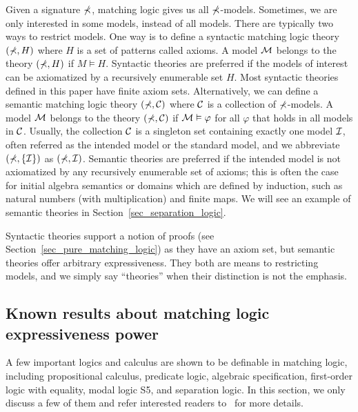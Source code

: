 \documentclass{amsart}
\begin{document}
Given a signature $\mathbb{\Sigma}$, matching logic gives us all $\mathbb{\Sigma}$-models.
Sometimes, we are only interested in some models, instead of all models.
There are typically two ways to restrict models.
One way is to define a syntactic matching logic theory
$(\mathbb{\Sigma}, H)$ where $H$ is a set of patterns called axioms.
A model $\mathcal{M}$ belongs to the theory $(\mathbb{\Sigma}, H)$ if $M \vDash H$.
Syntactic theories are preferred if the models of interest can be
axiomatized by a recursively enumerable set $H$.
Most syntactic theories defined in this paper have finite axiom sets.
Alternatively, we can define a semantic matching logic theory
$(\mathbb{\Sigma}, \mathcal{C})$ where $\mathcal{C}$ is a collection of $\mathbb{\Sigma}$-models.
A model $\mathcal{M}$ belongs to the theory $(\mathbb{\Sigma}, \mathcal{C})$ if
$\mathcal{M} \vDash \varphi$ for all $\varphi$ that holds in all models in $\mathcal{C}$.
Usually, the collection $\mathcal{C}$ is a singleton set containing exactly one model
$\mathcal{I}$,
often referred as the intended model or the standard model,
and we abbreviate $(\mathbb{\Sigma}, \{ \mathcal{I} \})$ as $(\mathbb{\Sigma}, \mathcal{I})$.
Semantic theories are preferred if the intended model is not axiomatized by any
recursively enumerable set of axioms;
this is often the case for 
initial algebra semantics or domains which are defined by induction, such as
natural numbers (with multiplication) and finite maps.
We will see an example of semantic theories in
Section~\ref{sec_separation_logic}.

Syntactic theories support a notion of proofs (see
Section~\ref{sec_pure_matching_logic})
as they have an axiom set,
but semantic theories offer arbitrary expressiveness.
They both are means to restricting models,
and we simply say ``theories'' when their distinction is not the emphasis.



\subsection{Known results about matching logic expressiveness power}





A few important logics and calculus are shown to be definable 
in matching logic, including
propositional calculus, predicate logic,
algebraic specification, first-order logic with equality,
modal logic S5, and separation logic.
In this section, we only discuss a few of them and refer interested readers
to~\cite{bibid} for more details.
\end{document}
